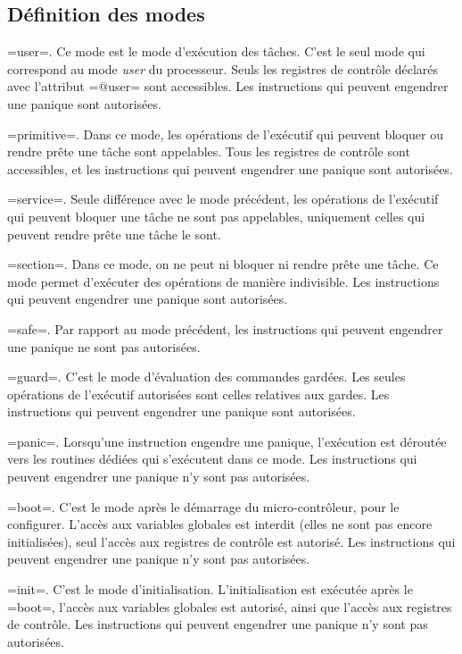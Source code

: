 \subsection{Définition des modes}

\plm=user=. Ce mode est le mode d'exécution des tâches. C'est le seul mode qui correspond au mode \emph{user} du processeur. Seuls les registres de contrôle déclarés avec l'attribut \plm=@user= sont accessibles. Les instructions qui peuvent engendrer une panique sont autorisées.

\plm=primitive=. Dans ce mode, les opérations de l'exécutif qui peuvent bloquer ou rendre prête une tâche sont appelables. Tous les registres de contrôle sont accessibles, et les instructions qui peuvent engendrer une panique sont autorisées. 

\plm=service=. Seule différence avec le mode précédent, les opérations de l'exécutif qui peuvent bloquer une tâche ne sont pas appelables, uniquement celles qui peuvent rendre prête une tâche le sont.

\plm=section=. Dans ce mode, on ne peut ni bloquer ni rendre prête une tâche. Ce mode permet d'exécuter des opérations de manière indivisible. Les instructions qui peuvent engendrer une panique sont autorisées.

\plm=safe=. Par rapport au mode précédent, les instructions qui peuvent engendrer une panique ne sont pas autorisées.

\plm=guard=. C'est le mode d'évaluation des commandes gardées. Les seules opérations de l'exécutif autorisées sont celles relatives aux gardes. Les instructions qui peuvent engendrer une panique sont autorisées.

\plm=panic=. Lorsqu'une instruction engendre une panique, l'exécution est déroutée vers les routines dédiées qui s'exécutent dans ce mode.  Les instructions qui peuvent engendrer une panique n'y sont pas autorisées.

\plm=boot=. C'est le mode après le démarrage du micro-contrôleur, pour le configurer. L'accès aux variables globales est interdit (elles ne sont pas encore initialisées), seul l'accès aux registres de contrôle est autorisé. Les instructions qui peuvent engendrer une panique n'y sont pas autorisées.


\plm=init=. C'est le mode d'initialisation. L'initialisation est exécutée après le \plm=boot=, l'accès aux variables globales est autorisé, ainsi que l'accès aux registres de contrôle. Les instructions qui peuvent engendrer une panique n'y sont pas autorisées.














